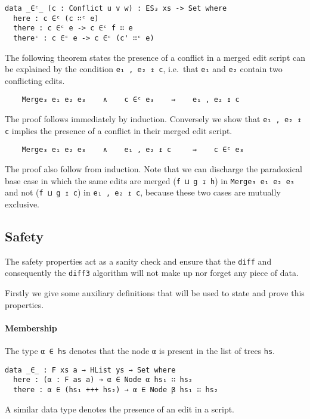 \documentclass[preprint]{sigplanconf}
\begin{document}
\begin{verbatim}
data _∈ᶜ_ (c : Conflict u v w) : ES₃ xs -> Set where
  here : c ∈ᶜ (c ∷ᶜ e)
  there : c ∈ᶜ e -> c ∈ᶜ f ∷ e
  thereᶜ : c ∈ᶜ e -> c ∈ᶜ (c' ∷ᶜ e)
\end{verbatim}

    The following theorem states the presence of a conflict in a merged
    edit script can be explained by the condition \texttt{e₁ , e₂ ↥ c}, i.e.\
    that \texttt{e₁} and \texttt{e₂} contain two conflicting edits.

\begin{verbatim}
    Merge₃ e₁ e₂ e₃    ∧    c ∈ᶜ e₃    ⇒    e₁ , e₂ ↥ c
\end{verbatim}
    The proof follows immediately by induction.
    Conversely we show that \texttt{e₁ , e₂ ↥ c} implies the presence
    of a conflict in their merged edit script.
\begin{verbatim}
    Merge₃ e₁ e₂ e₃    ∧    e₁ , e₂ ↥ c     ⇒    c ∈ᶜ e₃
\end{verbatim}
    The proof also follow from induction. Note that we can discharge the paradoxical
    base case in which the same edits are merged (\texttt{f ⊔ g ↧ h}) in 
    \texttt{Merge₃ e₁ e₂ e₃} and not (\texttt{f ⊔ g ↥ c}) in \texttt{e₁ , e₂ ↥ c},
    because these two cases are mutually exclusive.    

    \subsection{Safety}
    The safety properties act as a sanity check and ensure that the \texttt{diff} 
    and consequently the  \texttt{diff3} algorithm will not make up nor forget any 
    piece of data.

    Firstly we give some auxiliary definitions that will be used to state and prove
    this properties.

    \paragraph{Membership}
    The type \texttt{α ∈ hs} denotes that the node \texttt{α} is present
    in the list of trees \texttt{hs}.

\begin{verbatim}
data _∈_ : F xs a → HList ys → Set where
  here : (α : F as a) → α ∈ Node α hs₁ ∷ hs₂
  there : α ∈ (hs₁ +++ hs₂) → α ∈ Node β hs₁ ∷ hs₂
\end{verbatim}

    A similar data type denotes the presence of an edit in a script.
\end{document}
